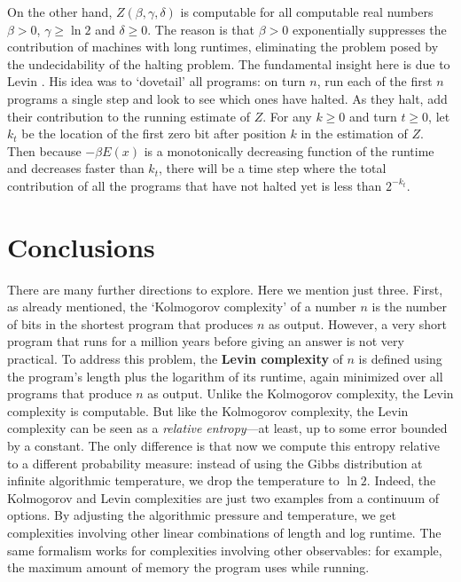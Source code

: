 \documentclass{article}
\begin{document}
On the other hand, $Z(\beta,\gamma,\delta)$ is computable for 
all computable real numbers $\beta > 0$, $\gamma \ge \ln 2$ and 
$\delta \ge 0$.   The reason is that $\beta > 0$ exponentially 
suppresses the contribution of machines with long runtimes, 
eliminating the problem posed by the undecidability of the
halting problem.  The fundamental insight here is due to 
Levin \cite{Levin1973}.  His idea was to `dovetail' all 
programs: on turn $n$, run each of the first $n$ programs a 
single step and look to see which ones have halted.  As they 
halt, add their contribution to the running estimate of $Z$.  
For any $k\ge 0$ and turn $t\ge 0$, let $k_t$ be the location 
of the first zero bit after position $k$ in the estimation of $Z$.  
Then because $-\beta E(x)$ is a monotonically decreasing function 
of the runtime and decreases faster than $k_t$, there will be a 
time step where the total contribution of all the programs that 
have not halted yet is less than $2^{-k_t}$.

\section{Conclusions}

There are many further directions to explore.  Here we mention just
three.  First, as already mentioned, the `Kolmogorov complexity' 
\cite{Kolmogorov1965} of a number $n$ is the number of bits in the 
shortest program that produces $n$ as output.   
However, a very short program that runs for a million years before
giving an answer is not very practical.  To address this problem,
the \textbf{Levin complexity} \cite{Levin1974} of $n$ is defined
using the program's length plus the logarithm of its runtime, again 
minimized over all programs that produce $n$ as output.  Unlike 
the Kolmogorov complexity, the Levin complexity is computable.  But 
like the Kolmogorov complexity, the Levin complexity can be seen 
as a \emph{relative entropy}---at least, up to some error bounded 
by a constant.   The only difference is that now we compute this 
entropy relative to a different probability measure: instead of using 
the Gibbs distribution at infinite algorithmic temperature, we drop 
the temperature to $\ln 2$.  Indeed, the Kolmogorov and Levin 
complexities are just two examples from a continuum of options.
By adjusting the algorithmic pressure and temperature, we get 
complexities involving other linear combinations of length and log 
runtime.  The same formalism works for complexities involving 
other observables: for example, the maximum amount of memory 
the program uses while running.
\end{document}
